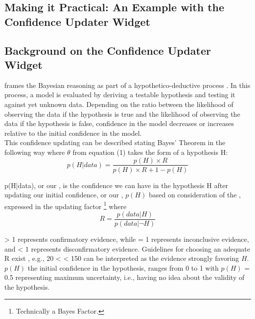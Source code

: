 \documentclass[man, floatsintext]{apa7} %
\begin{document}
\subsection{Making it Practical: An Example with the Confidence Updater Widget}

\subsection{Background on the Confidence Updater Widget}

\textcite{warren_impact_2020,warren_quantitative_2018} frames the Bayesian reasoning as part of a hypothetico-deductive process \parencite[][pp. 30, 360]{popper_objective_1979}. In this process, a model is evaluated by deriving a testable hypothesis and testing it against yet unknown data. Depending on the ratio between the likelihood of observing the data if the hypothesis is true and the likelihood of observing the data if the hypothesis is false, confidence in the model decreases or increases relative to the initial confidence in the model. \\

This confidence updating can be described stating Bayes' Theorem in the following way where $\theta$ from equation (1) takes the form of a hypothesis H: 
\begin{equation}
p(H|data) = \frac{p(H)\times R}{p(H)\times R+1-p(H)}
\end{equation}

p(H|data), or our , is the confidence we can have in the hypothesis H after updating our initial confidence, or our , $p(H)$ based on consideration of the , expressed in the updating factor \footnote{Technically a Bayes Factor.} where \\

\begin{equation}
R = \frac{p(data|H)}{p(data|\neg H)}
\end{equation}

 > 1 represents confirmatory evidence, while  = 1 represents inconclusive evidence, and  < 1 represents disconfirmatory evidence. Guidelines for choosing an adequate R exist \parencite{kass1995bayes}, e.g., 20 <  < 150 can be interpreted as the evidence strongly favoring $H$. $p(H)$ the initial confidence in the hypothesis, ranges from 0 to 1 with $p(H)$ = 0.5 representing maximum uncertainty, i.e., having no idea about the validity of the hypothesis. \\
\end{document}
